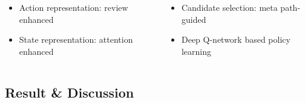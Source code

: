 \documentclass{../presentation}
\begin{document}
\begin{frame}
        \begin{columns}
            \begin{column}{0.5\linewidth}
                \begin{itemize}
                    \item Action representation: review enhanced
                    \item State representation: attention enhanced
                \end{itemize}
            \end{column}
            \begin{column}{0.5\linewidth}
                \begin{itemize}
                    \item Candidate selection: meta path-guided
                    \item Deep Q-network based policy learning
                \end{itemize}
            \end{column}
        \end{columns}

    \end{frame}

    \subsection{Result \& Discussion}
\end{document}
